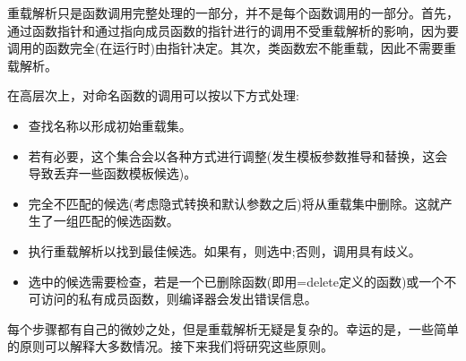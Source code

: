 重载解析只是函数调用完整处理的一部分，并不是每个函数调用的一部分。首先，通过函数指针和通过指向成员函数的指针进行的调用不受重载解析的影响，因为要调用的函数完全(在运行时)由指针决定。其次，类函数宏不能重载，因此不需要重载解析。

在高层次上，对命名函数的调用可以按以下方式处理:

\begin{itemize}
\item 
查找名称以形成初始重载集。

\item 
若有必要，这个集合会以各种方式进行调整(发生模板参数推导和替换，这会导致丢弃一些函数模板候选)。

\item 
完全不匹配的候选(考虑隐式转换和默认参数之后)将从重载集中删除。这就产生了一组匹配的候选函数。

\item 
执行重载解析以找到最佳候选。如果有，则选中;否则，调用具有歧义。

\item 
选中的候选需要检查，若是一个已删除函数(即用=delete定义的函数)或一个不可访问的私有成员函数，则编译器会发出错误信息。
\end{itemize}

每个步骤都有自己的微妙之处，但是重载解析无疑是复杂的。幸运的是，一些简单的原则可以解释大多数情况。接下来我们将研究这些原则。














































